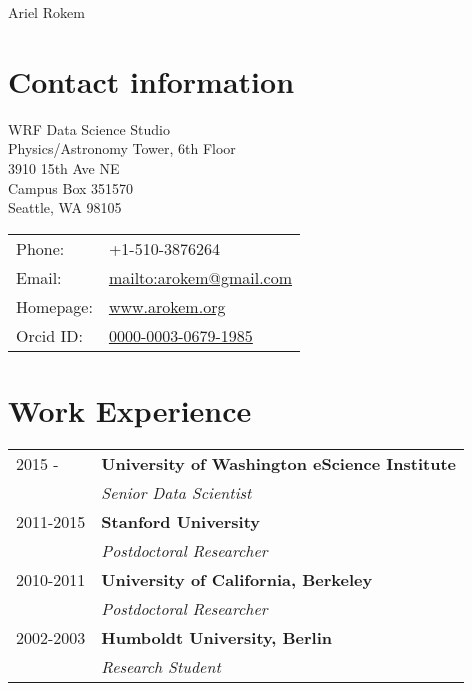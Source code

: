 \documentclass[11pt, a4paper]{article} %
\begin{document}

{\LARGE Ariel Rokem}\\[1cm] %

\section*{Contact information}

\begin{minipage}{0.50\linewidth}
  WRF Data Science Studio\\
  Physics/Astronomy Tower, 6th Floor\\
  3910 15th Ave NE\\
  Campus Box 351570\\
  Seattle, WA 98105\\
\end{minipage}
\begin{minipage}{0.50\linewidth}
  \begin{tabular}{ll}
    Phone: & +1-510-3876264 \\
    Email: & \href{mailto:arokem@gmail.com}{mailto:arokem@gmail.com} \\
    Homepage: & \href{http://arokem.org/}{www.arokem.org} \\
    Orcid ID: & \href{http://orcid.org/0000-0003-0679-1985}{0000-0003-0679-1985} \\
  \end{tabular}
\end{minipage}

\section*{Work Experience}

\begin{tabular}{ll}
  2015 -  & {\bf University of Washington eScience Institute}\\
  & \emph{Senior Data Scientist}\\
  2011-2015 & {\bf Stanford University}\\
  & \emph{Postdoctoral Researcher}\\
  2010-2011 & {\bf University of California, Berkeley}\\
  & \emph{Postdoctoral Researcher}\\
  2002-2003 & {\bf Humboldt University, Berlin}\\
  & \emph{Research Student}\\

\end{tabular}
\end{document}
